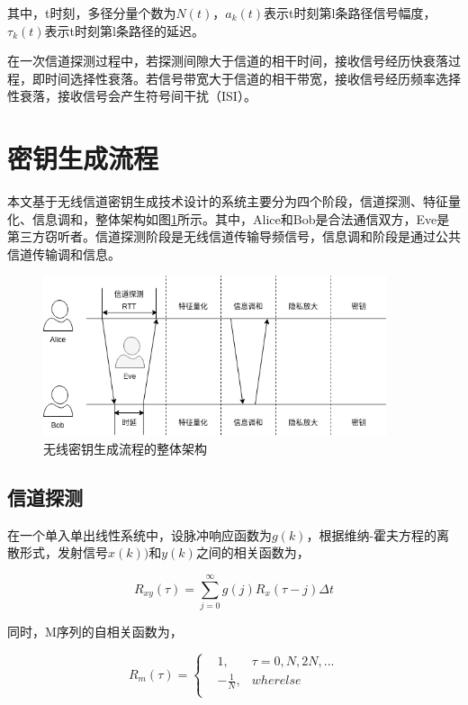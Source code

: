 \documentclass[master]{seuthesis} %
\begin{document}
\begin{Main}
其中，t时刻，多径分量个数为$N(t)$，$a_k(t)$表示t时刻第l条路径信号幅度，$\tau_k(t)$表示t时刻第l条路径的延迟。

在一次信道探测过程中，若探测间隙大于信道的相干时间，接收信号经历快衰落过程，即时间选择性衰落。若信号带宽大于信道的相干带宽，接收信号经历频率选择性衰落，接收信号会产生符号间干扰（ISI）。


\section{密钥生成流程}

本文基于无线信道密钥生成技术设计的系统主要分为四个阶段，信道探测、特征量化、信息调和，整体架构如图\ref{whole_structure}所示。其中，Alice和Bob是合法通信双方，Eve是第三方窃听者。信道探测阶段是无线信道传输导频信号，信息调和阶段是通过公共信道传输调和信息。

\begin{figure}[htbp!]
    \centering \includegraphics[width=0.9\textwidth]{images/whole_structure} 
    \caption{无线密钥生成流程的整体架构}
    \label{whole_structure}
\end{figure}

\subsection{信道探测}

在一个单入单出线性系统中，设脉冲响应函数为$g(k)$，根据维纳-霍夫方程的离散形式，发射信号$x(k))$和$y(k)$之间的相关函数为，

\begin{equation}
    R_{xy}(\tau)  = \sum_{j=0}^{\infty} g(j) R_x(\tau-j)\Delta t
\end{equation}

同时，M序列的自相关函数为，

\begin{equation} \label{m_self}
    R_m(\tau) = \left\{
  \begin{aligned}
  &1, &\tau = 0, N, 2N, ... \\
  &-\frac{1}{N}, &wherelse \\
  \end{aligned}
  \right.
\end{equation}


\end{Main}
\end{document}
